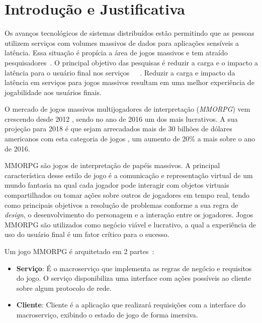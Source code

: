 \section{Introdução e Justificativa}
\label{sec:int}

Os avanços tecnológicos de sistemas distribuídos estão permitindo que as pessoas utilizem serviços com volumes massivos de dados para aplicações sensíveis a latência.
%
Essa situação é propícia a área de jogos massivos e tem atraído pesquisadores~\cite{mmo_analytic}.
%
O principal objetivo das pesquisas é reduzir a carga e o impacto a latência para o usuário final nos serviços~\cite{1417630}~\cite{6267019}~\cite{6063041}.
%
Reduzir a carga e impacto da latência em serviços para jogos massivos resultam em uma melhor experiência de jogabilidade aos usuários finais\cite{1417630}.



O mercado de jogos massivos multijogadores de interpretação (\textit{MMORPG}) vem crescendo desde 2012 \cite{new_york_times}, sendo no ano de 2016 um dos mais lucrativos\cite{statista_2016}. %
%
A sua projeção para 2018 é que sejam arrecadados mais de 30 bilhões de dólares americanos com esta categoria de jogos \cite{statista_2018}, um aumento de 20\% a mais sobre o ano de 2016.



\ac{MMORPG} são jogos de interpretação de papéis massivos.
%
A principal característica desse estilo de jogo é a comunicação e representação virtual de um mundo fantasia na qual cada jogador pode interagir com objetos virtuais compartilhados ou tomar ações sobre outros de jogadores em tempo real, tendo como principais objetivos a resolução de problemas conforme a sua regra de \textit{design}, o desenvolvimento do personagem e a interação entre os jogadores\cite{video_game_technologies}.
%
Jogos \ac{MMORPG} são utilizados como negócio viável e lucrativo, a qual a experiência de uso do usuário final é um fator crítico para o sucesso.

Um jogo \ac{MMORPG} é arquitetado em 2 partes~\cite{mmo_analytic}:
\begin{itemize}
  \item \textbf{Serviço}: É o macroserviço que implementa as regras de negócio e requisitos do jogo.
  O serviço disponibiliza uma interface com ações possíveis ao cliente sobre algum protocolo de rede.
  \item \textbf{Cliente}: Cliente é a aplicação que realizará requisições com a interface do macroserviço, exibindo o estado de jogo de forma imersiva.
\end{itemize}


